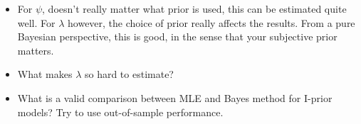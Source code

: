 \documentclass[english, 11pt]{article}
\begin{document}
\begin{itemize}
	\item For $\psi$, doesn't really matter what prior is used, this can be estimated quite well. For $\lambda$ however, the choice of prior really affects the results. From a pure Bayesian perspective, this is good, in the sense that your subjective prior matters.
	\item What makes $\lambda$ so hard to estimate?
	\item What is a valid comparison between MLE and Bayes method for I-prior models? Try to use out-of-sample performance.
\end{itemize}


%
%

%
\end{document}

